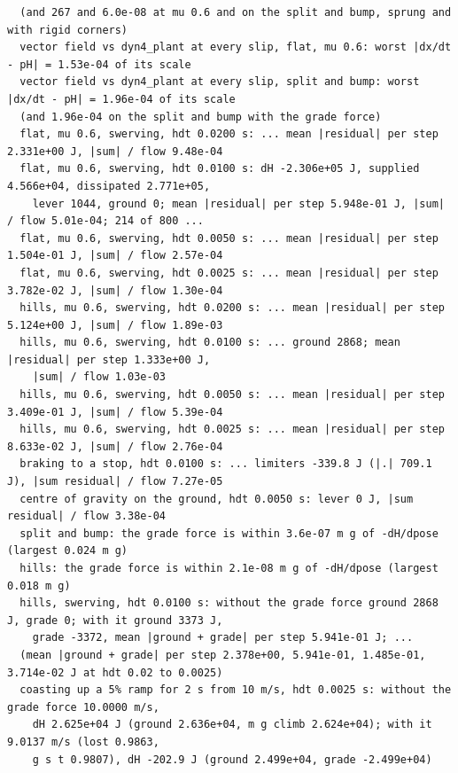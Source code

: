 \documentclass[11pt]{article}
\theoremstyle{remark}
\begin{document}
\begin{center}
\begin{minipage}{0.98\linewidth}
\begin{verbatim}
  (and 267 and 6.0e-08 at mu 0.6 and on the split and bump, sprung and with rigid corners)
  vector field vs dyn4_plant at every slip, flat, mu 0.6: worst |dx/dt - pH| = 1.53e-04 of its scale
  vector field vs dyn4_plant at every slip, split and bump: worst |dx/dt - pH| = 1.96e-04 of its scale
  (and 1.96e-04 on the split and bump with the grade force)
  flat, mu 0.6, swerving, hdt 0.0200 s: ... mean |residual| per step 2.331e+00 J, |sum| / flow 9.48e-04
  flat, mu 0.6, swerving, hdt 0.0100 s: dH -2.306e+05 J, supplied 4.566e+04, dissipated 2.771e+05,
    lever 1044, ground 0; mean |residual| per step 5.948e-01 J, |sum| / flow 5.01e-04; 214 of 800 ...
  flat, mu 0.6, swerving, hdt 0.0050 s: ... mean |residual| per step 1.504e-01 J, |sum| / flow 2.57e-04
  flat, mu 0.6, swerving, hdt 0.0025 s: ... mean |residual| per step 3.782e-02 J, |sum| / flow 1.30e-04
  hills, mu 0.6, swerving, hdt 0.0200 s: ... mean |residual| per step 5.124e+00 J, |sum| / flow 1.89e-03
  hills, mu 0.6, swerving, hdt 0.0100 s: ... ground 2868; mean |residual| per step 1.333e+00 J,
    |sum| / flow 1.03e-03
  hills, mu 0.6, swerving, hdt 0.0050 s: ... mean |residual| per step 3.409e-01 J, |sum| / flow 5.39e-04
  hills, mu 0.6, swerving, hdt 0.0025 s: ... mean |residual| per step 8.633e-02 J, |sum| / flow 2.76e-04
  braking to a stop, hdt 0.0100 s: ... limiters -339.8 J (|.| 709.1 J), |sum residual| / flow 7.27e-05
  centre of gravity on the ground, hdt 0.0050 s: lever 0 J, |sum residual| / flow 3.38e-04
  split and bump: the grade force is within 3.6e-07 m g of -dH/dpose (largest 0.024 m g)
  hills: the grade force is within 2.1e-08 m g of -dH/dpose (largest 0.018 m g)
  hills, swerving, hdt 0.0100 s: without the grade force ground 2868 J, grade 0; with it ground 3373 J,
    grade -3372, mean |ground + grade| per step 5.941e-01 J; ...
  (mean |ground + grade| per step 2.378e+00, 5.941e-01, 1.485e-01, 3.714e-02 J at hdt 0.02 to 0.0025)
  coasting up a 5% ramp for 2 s from 10 m/s, hdt 0.0025 s: without the grade force 10.0000 m/s,
    dH 2.625e+04 J (ground 2.636e+04, m g climb 2.624e+04); with it 9.0137 m/s (lost 0.9863,
    g s t 0.9807), dH -202.9 J (ground 2.499e+04, grade -2.499e+04)
\end{verbatim}
\end{minipage}
\end{center}
\end{document}
